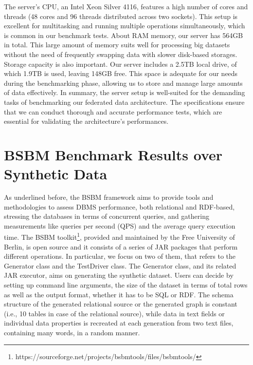 The server's CPU, an Intel Xeon Silver 4116, features a high number of cores and threads (48 cores and 96 threads distributed across two sockets). This setup is excellent for multitasking and running multiple operations simultaneously, which is common in our benchmark tests.
About \ac{RAM} memory, our server has 564GB in total. This large amount of memory suits well for processing big datasets without the need of frequently swapping data with slower disk-based storages.
Storage capacity is also important. Our server includes a 2.5TB local drive, of which 1.9TB is used, leaving 148GB free. This space is adequate for our needs during the benchmarking phase, allowing us to store and manage large amounts of data effectively.
In summary, the server setup is well-suited for the demanding tasks of benchmarking our federated data architecture. The specifications ensure that we can conduct thorough and accurate performance tests, which are essential for validating the architecture's performances.


\section{BSBM Benchmark Results over Synthetic Data}
As underlined before, the \ac{BSBM} framework aims to provide tools and methodologies to assess \ac{DBMS} performance, both relational and RDF-based, stressing the databases in terms of concurrent queries, and gathering measurements like queries per second (QPS) and the average query execution time.
The \ac{BSBM} toolkit\footnote{https://sourceforge.net/projects/bsbmtools/files/bsbmtools/}, provided and maintained by the Free University of Berlin, is open source and it consists of a series of \ac{JAR} packages that perform different operations.
In particular, we focus on two of them, that refers to the Generator class and the TestDriver class. The Generator class, and its related \ac{JAR} executor, aims on generating the synthetic dataset. Users can decide by setting up command line arguments, the size of the dataset in terms of total rows as well as the output format, whether it has to be \ac{SQL} or \ac{RDF}. The schema structure of the generated relational source or the generated graph is constant (i.e., 10 tables in case of the relational source), while data in text fields or individual data properties is recreated at each generation from two text files, containing many words, in a random manner.


